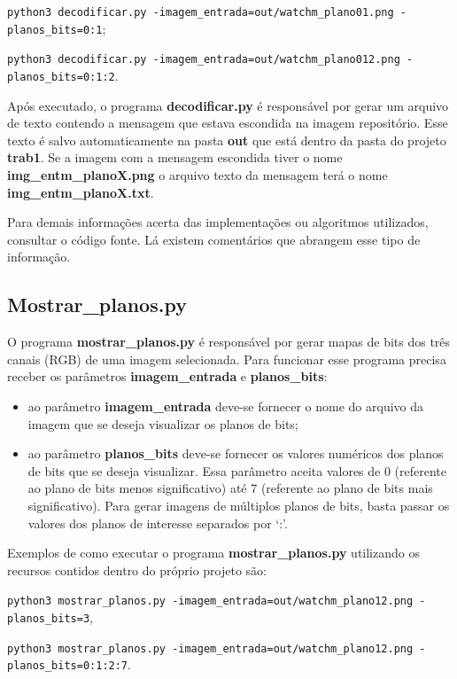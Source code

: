 \documentclass{article}
\begin{document}
\lstinline{python3 decodificar.py -imagem_entrada=out/watchm_plano01.png -planos_bits=0:1};

\lstinline{python3 decodificar.py -imagem_entrada=out/watchm_plano012.png -planos_bits=0:1:2}.

\noindent
Após executado, o programa \textbf{decodificar.py} é responsável por gerar um arquivo de texto contendo a mensagem que estava escondida na imagem repositório. Esse texto é salvo automaticamente na pasta \textbf{out} que está dentro da pasta do projeto \textbf{trab1}. Se a imagem com a mensagem escondida tiver o nome \textbf{img\_entm\_planoX.png} o arquivo texto da mensagem terá o nome \textbf{img\_entm\_planoX.txt}.

Para demais informações acerta das implementações ou algoritmos utilizados, consultar o código fonte. Lá existem comentários que abrangem esse tipo de informação.

%
\subsection{Mostrar\_planos.py}
O programa \textbf{mostrar\_planos.py} é responsável por gerar mapas de bits dos três canais (RGB) de uma imagem selecionada. Para funcionar esse programa precisa receber os parâmetros \textbf{imagem\_entrada} e \textbf{planos\_bits}:

\begin{itemize}
	\item ao parâmetro \textbf{imagem\_entrada} deve-se fornecer o nome do arquivo da imagem que se deseja visualizar os planos de bits;
	\item ao parâmetro \textbf{planos\_bits} deve-se fornecer os valores numéricos dos planos de bits que se deseja visualizar. Essa parâmetro aceita valores de 0 (referente ao plano de bits menos significativo) até 7 (referente ao plano de bits mais significativo). Para gerar imagens de múltiplos planos de bits, basta passar os valores dos planos de interesse separados por `:'.
\end{itemize}

\noindent
Exemplos de como executar o programa \textbf{mostrar\_planos.py} utilizando os recursos contidos dentro do próprio projeto são:

\lstinline{python3 mostrar_planos.py -imagem_entrada=out/watchm_plano12.png -planos_bits=3},

\lstinline{python3 mostrar_planos.py -imagem_entrada=out/watchm_plano12.png -planos_bits=0:1:2:7}.
\end{document}
